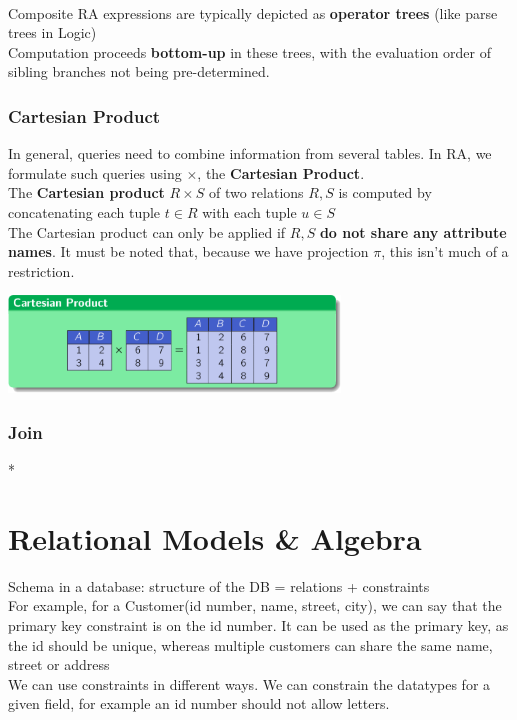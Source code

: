 \documentclass{article}
\begin{document}
\\Composite RA expressions are typically depicted as \textbf{operator trees} (like parse trees in Logic)
\\Computation proceeds \textbf{bottom-up} in these trees, with the evaluation order of sibling branches not being pre-determined.

\subsubsection*{Cartesian Product}
In general, queries need to combine information from several tables. In RA, we formulate such queries using $\times$, the \textbf{Cartesian Product}.
\\The \textbf{Cartesian product} $R \times S$ of two relations $R,S$ is computed by concatenating each tuple $t\in R$ with each tuple $u \in S$
\\The Cartesian product can only be applied if $R, S$ \textbf{do not share any attribute names}. It must be noted that, because we have projection $\pi$, this isn't much of a restriction.
\begin{center}
\includegraphics[width= 250pt]{tex/lecture2/cartesianproduct.png}
\end{center}
\subsubsection{Join}





























\/*
\section*{Relational Models \& Algebra}
Schema in a database: structure of the DB = relations + constraints
\\For example, for a Customer(id number, name, street, city), we can say that the primary key constraint is on the id number. It can be used as the primary key, as the id should be unique, whereas multiple customers can share the same name, street or address
\\We can use constraints in different ways. We can constrain the datatypes for a given field, for example an id number should not allow letters.  
\end{document}
